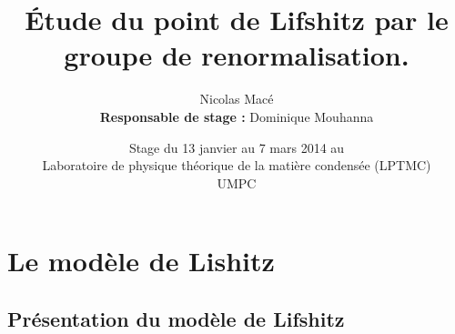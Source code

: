 \documentclass[xcolor=dvipsnames]{beamer}
\title[Étude du point de Lifshitz par le groupe de renormalisation.]{Étude du point de Lifshitz par le groupe de renormalisation.}
\date{Stage du 13 janvier au 7 mars 2014 au \\ 
Laboratoire de physique théorique de la matière condensée (LPTMC) \\ 
\small{UMPC}}
\author{Nicolas Macé \\
\textbf{Responsable de stage :} Dominique Mouhanna}
\begin{document}
\begin{frame}
\begin{titlepage}
\end{titlepage}
\end{frame}


\section{Le modèle de Lishitz}

\subsection{Présentation du modèle de Lifshitz}

\begin{frame}



\end{frame}
\end{document}

